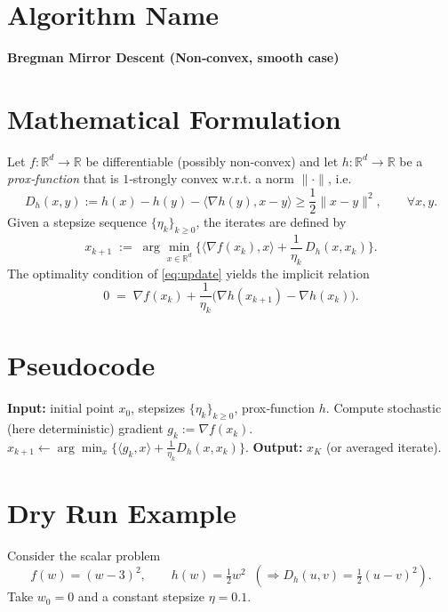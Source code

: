 \documentclass{article}
\newcommand{\breg}[2]{D_h(#1,#2)}
\begin{document}
\section*{Algorithm Name}
\textbf{Bregman Mirror Descent (Non‑convex, smooth case)}

\section*{Mathematical Formulation}
Let $f:\mathbb{R}^d\to \mathbb{R}$ be differentiable (possibly non‑convex) and let $h:\mathbb{R}^d\to\mathbb{R}$ be a \emph{prox‑function} that is $1$‑strongly convex w.r.t. a norm $\|\cdot\|$, i.e.
\[
\breg{x}{y}:=h(x)-h(y)-\langle\nabla h(y),x-y\rangle\ge\frac12\|x-y\|^{2},\qquad\forall x,y.
\]
Given a stepsize sequence $\{\eta_k\}_{k\ge0}$, the iterates are defined by
\begin{equation}\label{eq:update}
x_{k+1}
\;:=\;
\arg\min_{x\in\mathbb{R}^d}
\Big\{\langle\nabla f(x_k),x\rangle+\frac{1}{\eta_k}\,\breg{x}{x_k}\Big\}.
\end{equation}
The optimality condition of \eqref{eq:update} yields the implicit relation
\begin{equation}\label{eq:optcond}
0\;=\;\nabla f(x_k)+\frac{1}{\eta_k}\big(\nabla h(x_{k+1})-\nabla h(x_k)\big). 
\end{equation}

\section*{Pseudocode}
\begin{algorithm}[H]
\caption{Bregman Mirror Descent}
\begin{algorithmic}[1]
\STATE \textbf{Input:} initial point $x_0$, stepsizes $\{\eta_k\}_{k\ge0}$, prox‑function $h$.
\STATE Compute stochastic (here deterministic) gradient $g_k:=\nabla f(x_k)$.
\STATE $x_{k+1}\gets\displaystyle\arg\min_x\Big\{\langle g_k,x\rangle+\frac{1}{\eta_k}\breg{x}{x_k}\Big\}$.
\BREAK
\ENDIF
\ENDFOR
\STATE \textbf{Output:} $x_{K}$ (or averaged iterate).
\end{algorithmic}
\end{algorithm}

\section*{Dry Run Example}
Consider the scalar problem 
\[
f(w)=(w-3)^2,\qquad h(w)=\tfrac12 w^2\;\;(\Rightarrow\breg{u}{v}=\tfrac12 (u-v)^2).
\]
Take $w_0=0$ and a constant stepsize $\eta=0.1$.
\end{document}
